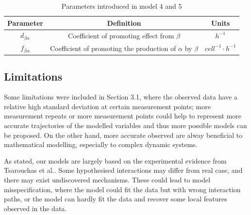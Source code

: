\begin{table}[h!]
    \centering
    \begin{tabular}{|c c c|}
        \hline
        Parameter         & Definition                                                     & Units                    \\ [0.5ex]
        \hline\hline
        $d_{\beta\alpha}$ & Coefficient of promoting effect from $\beta$                   & $h^{-1}$                 \\
        \hline
        $f_{\beta\alpha}$ & Coefficient of promoting the production of $\alpha$ by $\beta$ & $cell^{-1}\cdotp h^{-1}$ \\
        \hline
    \end{tabular}
    \caption{Parameters introduced in model 4 and 5}
    \label{table:m45}
\end{table}







\subsection{Limitations}




Some limitations were included in Section 3.1, where the observed data have a relative high standard deviation at certain measurement points; more measurement repeats or more measurement points could help to represent more accurate trajectories of the modelled variables and thus more possible models can be proposed. On the other hand, more accurate observed are alway beneficial to mathematical modelling, especially to complex dynamic systems.

As stated, our models are largely based on the experimental evidence from Tsarouchas et al.\cite{ref:Tsarouchas}. Some hypothesised interactions may differ from real case, and there may exist undiscovered mechanisms. These could lead to model misspecification, where the model could fit the data but with wrong interaction paths, or the model can hardly fit the data and recover some local features observed in the data.

